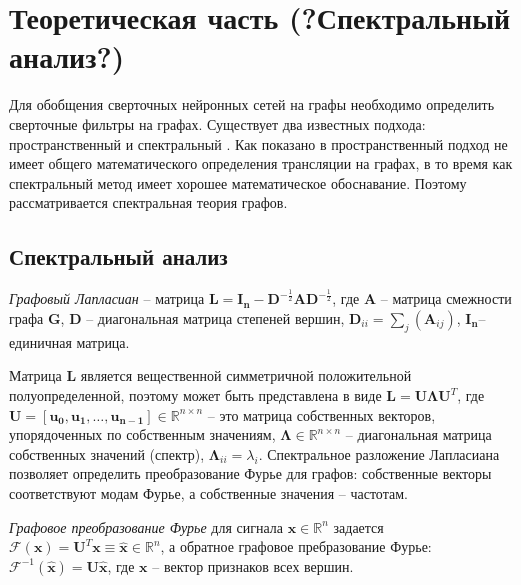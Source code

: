 \documentclass[12pt,twosides]{article}
\begin{document}
	\section{Теоретическая часть (?Спектральный анализ?)}
	
	Для обобщения сверточных нейронных сетей на графы необходимо определить сверточные фильтры на графах. Существует два известных подхода: пространственный и спектральный \cite{DBLP:journals/corr/abs-1901-00596, DBLP:journals/corr/abs-1812-08434}. Как показано в \cite{ae482107de73461787258f805cf8f4ed} пространственный подход не имеет общего математического определения трансляции на графах, в то время как  спектральный метод имеет хорошее математическое обоснавание. Поэтому рассматривается спектральная теория графов.
	
	\subsection{Спектральный анализ}
	
	\begin{Def}
		\textit{Графовый Лапласиан} \cite{Chung:1997} -- матрица $\mathbf{L}=\mathbf{I}_{\mathbf{n}}-\mathbf{D}^{-\frac{1}{2}} \mathbf{A} \mathbf{D}^{-\frac{1}{2}}$, где $\mathbf{A}$ -- матрица смежности графа $\mathbf{G}$,  $\mathbf{D}$ -- диагональная матрица степеней вершин, $\mathbf{D}_{i i}=\sum_{j}\left(\mathbf{A}_{i j}\right)$, $\mathbf{I}_{\mathbf{n}}$-- единичная матрица.
	\end{Def}


	
	Матрица $\mathbf{L}$ является вещественной симметричной положительной полуопределенной, поэтому может быть представлена в виде  $\mathbf{L}=\mathbf{U} \mathbf{\Lambda} \mathbf{U}^{T} $, где $\mathbf{U}=\left[\mathbf{u}_{\mathbf{0}}, \mathbf{u}_{\mathbf{1}}, \dots, \mathbf{u}_{\mathbf{n}-\mathbf{1}}\right] \in \mathbb{R}^{n \times n}$ -- это матрица собственных векторов, упорядоченных по собственным значениям, $\boldsymbol{\Lambda} \in \mathbb{R}^{n \times n}$ -- диагональная матрица собственных значений (спектр), $\boldsymbol{\Lambda}_{i i}=\lambda_{i}$. Спектральное разложение Лапласиана позволяет определить преобразование Фурье для графов: собственные векторы соответствуют модам Фурье, а собственные значения -- частотам. 
	
	\begin{Def}
		\textit{Графовое преобразование Фурье}\cite{journals/spm/ShumanNFOV13} для сигнала $\mathbf{x} \in \mathbb{R}^{n}$ задается $\mathscr{F}(\mathbf{x})=\mathbf{U}^{T} \mathbf{x} \equiv \hat{\mathbf{x}} \in \mathbb{R}^{n}$, а обратное графовое пребразование Фурье: $\mathscr{F}^{-1}(\hat{\mathbf{x}})=\mathbf{U} \hat{\mathbf{x}}$, где $\mathbf{x}$ -- вектор признаков всех вершин.
	\end{Def}
\end{document}
